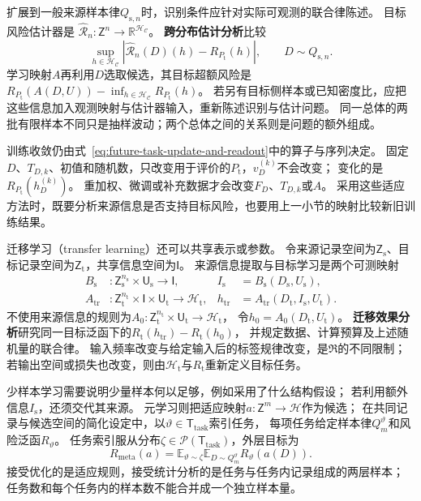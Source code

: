 扩展到一般来源样本律$Q_{{\mathrm s},n}$时，识别条件应针对实际可观测的联合律陈述。
目标风险估计器是
$\widehat{\mathcal R}_n:\mathsf Z^n\to\mathbb R^{\mathcal H_{\mathcal C}}$。
\textbf{跨分布估计分析}比较
\[
  \sup_{h\in\mathcal H_{\mathcal C}}
    |\widehat{\mathcal R}_n(D)(h)-R_{P_{\mathrm t}}(h)|,
  \qquad D\sim Q_{{\mathrm s},n}.
\]
学习映射$A$再利用$D$选取候选，其目标超额风险是
$R_{P_{\mathrm t}}(A(D,U))-\inf_{h\in\mathcal H_{\mathcal C}}R_{P_{\mathrm t}}(h)$。
若另有目标侧样本或已知密度比，应把这些信息加入观测映射与估计器输入，重新陈述识别与估计问题。
同一总体的两批有限样本不同只是抽样波动；两个总体之间的关系则是问题的额外组成。

训练收敛仍由式~\eqref{eq:future-task-update-and-readout}中的算子与序列决定。
固定$D$、$T_{D,k}$、初值和随机数，只改变用于评价的$P_{\mathrm t}$，$v_D^{(k)}$不会改变；
变化的是$R_{P_{\mathrm t}}(h_D^{(k)})$。
重加权、微调或补充数据才会改变$F_D$、$T_{D,k}$或$A$。
采用这些适应方法时，既要分析来源信息是否支持目标风险，也要用上一小节的映射比较新旧训练结果。

迁移学习（transfer learning）还可以共享表示或参数。
令来源记录空间为$\mathsf Z_{\mathrm s}$、目标记录空间为$\mathsf Z_{\mathrm t}$，共享信息空间为$\mathsf I$。
来源信息提取与目标学习是两个可测映射
\[
  \begin{aligned}
    B_{\mathrm s}&:\mathsf Z_{\mathrm s}^{n_{\mathrm s}}\times\mathsf U_{\mathrm s}\to\mathsf I,
      &I_{\mathrm s}&=B_{\mathrm s}(D_{\mathrm s},U_{\mathrm s}),\\
    A_{\mathrm{tr}}&:\mathsf Z_{\mathrm t}^{n_{\mathrm t}}\times\mathsf I\times\mathsf U_{\mathrm t}\to\mathcal H_{\mathrm t},
      &h_{\mathrm{tr}}&=A_{\mathrm{tr}}(D_{\mathrm t},I_{\mathrm s},U_{\mathrm t}).
  \end{aligned}
\]
不使用来源信息的规则为$A_0:\mathsf Z_{\mathrm t}^{n_{\mathrm t}}\times\mathsf U_{\mathrm t}\to\mathcal H_{\mathrm t}$，
令$h_0=A_0(D_{\mathrm t},U_{\mathrm t})$。
\textbf{迁移效果分析}研究同一目标泛函下的$R_{\mathrm t}(h_{\mathrm{tr}})-R_{\mathrm t}(h_0)$，
并规定数据、计算预算及上述随机量的联合律。
输入频率改变与给定输入后的标签规律改变，是$\mathfrak R$的不同限制；
若输出空间或损失也改变，则由$\mathcal H_{\mathrm t}$与$R_{\mathrm t}$重新定义目标任务。

少样本学习需要说明少量样本何以足够，例如采用了什么结构假设；
若利用额外信息$I_{\mathrm s}$，还须交代其来源。
元学习则把适应映射$a:\mathsf Z^m\to\mathcal H$作为候选；
在共同记录与候选空间的简化设定中，以$\vartheta\in\mathsf T_{\mathrm{task}}$索引任务，
每项任务给定样本律$Q_m^{\vartheta}$和风险泛函$R_{\vartheta}$。
任务索引服从分布$\zeta\in\mathcal P(\mathsf T_{\mathrm{task}})$，外层目标为
\[
  R_{\mathrm{meta}}(a)=
  \mathbb E_{\vartheta\sim\zeta}
  \mathbb E_{D\sim Q_m^{\vartheta}}R_{\vartheta}(a(D)).
\]
接受优化的是适应规则，接受统计分析的是任务与任务内记录组成的两层样本；
任务数和每个任务内的样本数不能合并成一个独立样本量。

